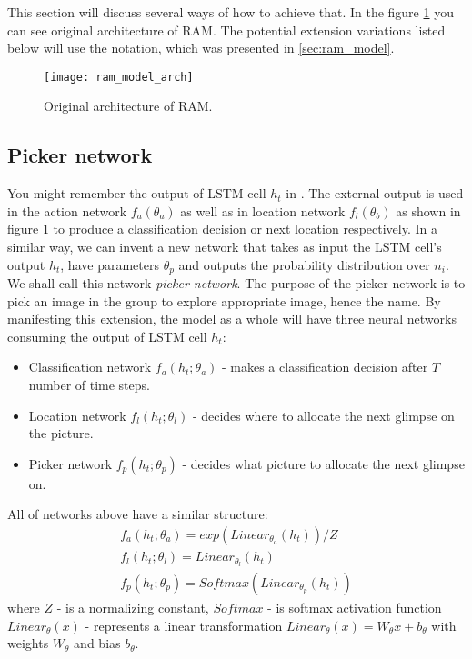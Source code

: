 {This section will discuss several ways of how to achieve that.
In the figure \ref{fig:ram_model_arch} you can see original architecture of RAM.
The potential extension variations listed below will use the notation, which
was presented in \autoref{sec:ram_model}.

\begin{figure}[h!]
	\texttt{[image: ram\_model\_arch]}
	\caption{Original architecture of RAM.}
	\label{fig:ram_model_arch}
\end{figure}

\subsection{Picker network}
\label{subs:picker_net}
You might remember the output of LSTM cell $h_t$ in \cite{DBLP:journals/corr/MnihHGK14}.
The external output is used
in the action network $f_a(\theta_a)$ as well as in location network $f_l(\theta_b)$
as shown in figure \ref{fig:ram_model_arch} to produce a classification decision or
next location respectively. In a similar way, we can invent a new network that takes as
input the LSTM cell's output $h_t$, have parameters $\theta_p$ and outputs
the probability distribution over $n_i$. We shall call this network
\emph{picker network}. The purpose of the picker network is to pick an image
in the group to explore appropriate image, hence the name. By manifesting
this extension, the model as a whole will have three neural networks consuming
the output of LSTM cell $h_t$:
\begin{itemize}
	\item Classification network $f_a(h_t; \theta_a)$ - makes a classification
		decision after $T$ number of time steps.
	\item Location network $f_l(h_t; \theta_l)$ - decides where to allocate the next glimpse
	on the picture.
	\item Picker network $f_p(h_t; \theta_p)$ - decides what picture to allocate the next glimpse on.
\end{itemize}

All of networks above have a similar structure:
\begin{align} \label{eq:picker_network}
	f_a(h_t; \theta_a) = exp(Linear_{\theta_a}(h_t))/Z \\
	f_l(h_t; \theta_l) = Linear_{\theta_l}(h_t) \\
	f_p(h_t; \theta_p) = Softmax(Linear_{\theta_p}(h_t))
\end{align}
where $Z$ - is a normalizing constant, $Softmax$ - is softmax activation function
$Linear_{\theta}(x)$ - represents
a linear transformation $Linear_{\theta}(x) = W_{\theta}x+b_{\theta}$ with weights
$W_{\theta}$ and bias $b_{\theta}$.


}
